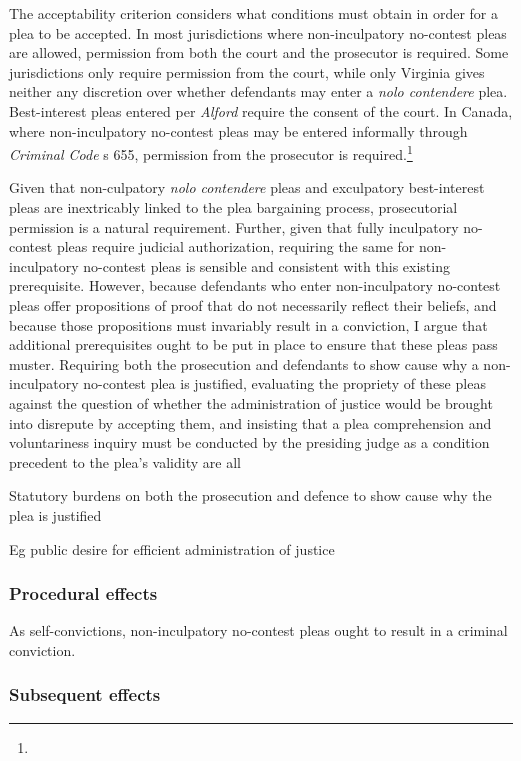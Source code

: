 The acceptability criterion considers what conditions must obtain in order for a plea to be accepted. In most jurisdictions where non-inculpatory no-contest pleas are allowed, permission from both the court and the prosecutor is required. Some jurisdictions only require permission from the court, while only Virginia gives neither any discretion over whether defendants may enter a \textit{nolo contendere} plea. Best-interest pleas entered per \textit{Alford} require the consent of the court. In Canada, where non-inculpatory no-contest pleas may be entered informally through \textit{Criminal Code} s 655, permission from the prosecutor is required.\footnote{} 

Given that non-culpatory \textit{nolo contendere} pleas and exculpatory best-interest pleas are inextricably linked to the plea bargaining process, prosecutorial permission is a natural requirement. Further, given that fully inculpatory no-contest pleas require judicial authorization, requiring the same for non-inculpatory no-contest pleas is sensible and consistent with this existing prerequisite. However, because defendants who enter non-inculpatory no-contest pleas offer propositions of proof that do not necessarily reflect their beliefs, and because those propositions must invariably result in a conviction, I argue that additional prerequisites ought to be put in place to ensure that these pleas pass muster. Requiring both the prosecution and defendants to show cause why a non-inculpatory no-contest plea is justified, evaluating the propriety of these pleas against the question of whether the administration of justice would be brought into disrepute by accepting them, and insisting that a plea comprehension and voluntariness inquiry must be conducted by the presiding judge as a condition precedent to the plea's validity are all 

Statutory burdens on both the prosecution and defence to show cause why the plea is justified

Eg public desire for efficient administration of justice

\subsubsection{Procedural effects}

As self-convictions, non-inculpatory no-contest pleas ought to result in a criminal conviction. 

\subsubsection{Subsequent effects}

